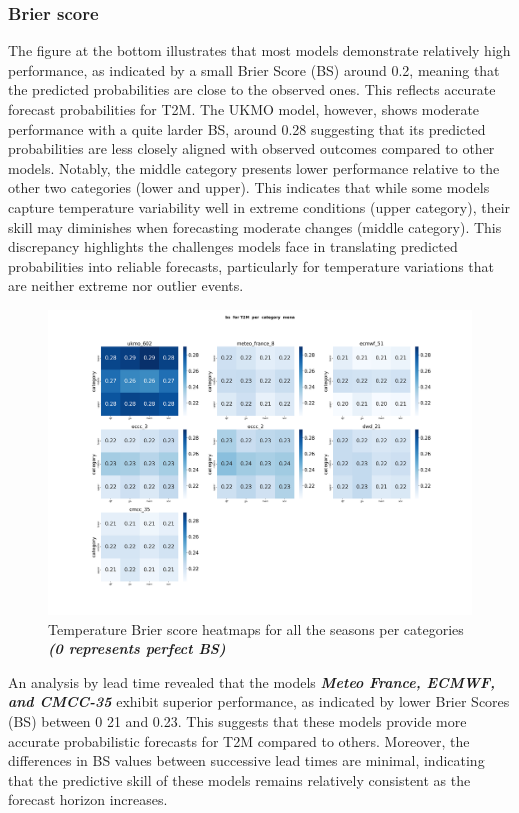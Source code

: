 \subsubsection{Brier score}

The figure at the bottom illustrates that most models demonstrate relatively high performance, as indicated by a small Brier Score (BS) around 0.2, meaning that the predicted probabilities are close to the observed ones. This reflects accurate forecast probabilities for T2M. The UKMO model, however, shows moderate performance with a quite larder BS, around 0.28 suggesting that its predicted probabilities are less closely aligned with observed outcomes compared to other models. Notably, the middle category presents lower performance relative to the other two categories (lower and upper). This indicates that while some models capture temperature variability well in extreme conditions (upper category), their skill may diminishes when forecasting moderate changes (middle category). This discrepancy highlights the challenges models face in translating predicted probabilities into reliable forecasts, particularly for temperature variations that are neither extreme nor outlier events. 


\begin{figure}[H]
    \centering
    \includegraphics[width=1\linewidth]{plots/prob/bs/bs_T2M_category_mena.png}
    \caption{Temperature Brier score heatmaps for all the seasons per categories \textbf{\textit{(0 represents perfect BS)} }}
\end{figure}

An analysis by lead time revealed that the models \textbf{\textit{ Meteo France, ECMWF, and CMCC-35 }} exhibit superior performance, as indicated by lower Brier Scores (BS) between 0
21 and 0.23. This suggests that these models provide more accurate probabilistic forecasts for T2M compared to others. Moreover, the differences in BS values between successive lead times are minimal, indicating that the predictive skill of these models remains relatively consistent as the forecast horizon increases.

